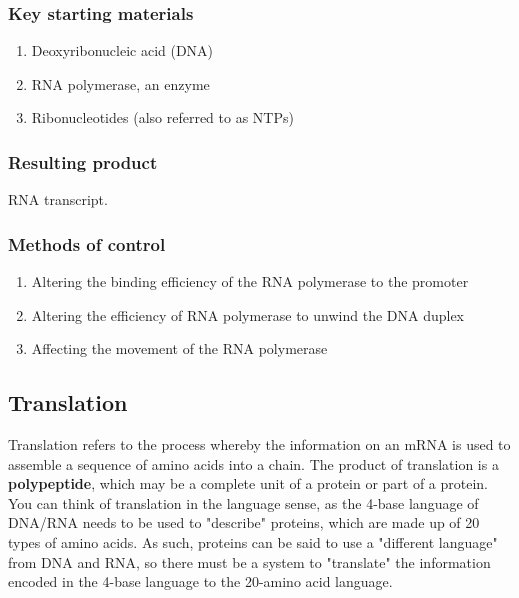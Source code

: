 \documentclass[11pt]{article}
\begin{document}
\subsubsection{Key starting materials}
\label{sec:org6f9e803}
\begin{enumerate}
\item Deoxyribonucleic acid (DNA)
\item RNA polymerase, an enzyme
\item Ribonucleotides (also referred to as NTPs)
\end{enumerate}

\subsubsection{Resulting product}
\label{sec:orga0dee9e}
RNA transcript.

\subsubsection{Methods of control}
\label{sec:org416e4ab}
\begin{enumerate}
\item Altering the binding efficiency of the RNA polymerase to the promoter
\item Altering the efficiency of RNA polymerase to unwind the DNA duplex
\item Affecting the movement of the RNA polymerase
\end{enumerate}

\newpage

\subsection{Translation}
\label{sec:orgafa35f5}
Translation refers to the process whereby the information on an mRNA is used to assemble a sequence of amino acids into a chain. The product of translation is a \textbf{polypeptide}, which may be a complete unit of a protein or part of a protein.
\\[0pt]

You can think of translation in the language sense, as the 4-base language of DNA/RNA needs to be used to "describe" proteins, which are made up of 20 types of amino acids. As such, proteins can be said to use a "different language" from DNA and RNA, so there must be a system to "translate" the information encoded in the 4-base language to the 20-amino acid language.
\\[0pt]
\end{document}
